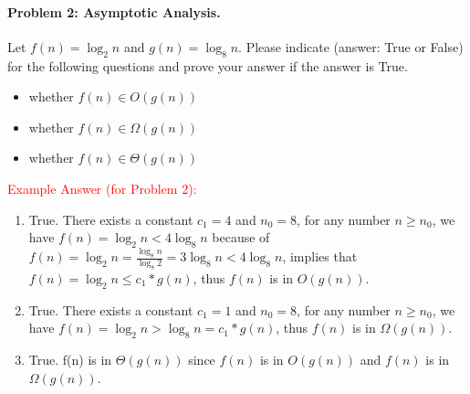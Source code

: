 
\paragraph{Problem 2: Asymptotic Analysis.}  	
 Let $f(n)=\log_2 n$ and $g(n)=\log_8 n$. Please indicate (answer: True or False) for the following questions and prove your answer if the answer is True.  
\begin{itemize}
	\item  whether $ f(n)\in O(g(n))$
	\item  whether $ f(n)\in \Omega(g(n))$
	\item  whether $ f(n) \in \Theta(g(n))$
\end{itemize}  
 

\textcolor{red}{Example Answer (for Problem 2):} 
	\begin{enumerate}[label=(\alph*)]
		   
			\item
		True. There exists a constant $c_1=4 $ and $n_0=8$, for any number $n \ge n_0$, we have $f(n) = \log_2 n < 4 \log_8 n $ because of $f(n) = \log_2 n = \frac{\log_8 n}{\log_8 2} = 3 \log_8 n < 4 \log_8 n $, implies that $f(n) = \log_2 n  \le c_1 *g(n)$, thus $f(n)$ is in $O(g(n))$.
		
		\item	True. There exists a constant $c_1=1$ and $n_0=8$, for any number $n \ge n_0$, we have $f(n)= \log_2 n >  \log_8 n = c_1 *g(n)$, thus $f(n)$ is in $\Omega(g(n))$.
		
		\item	True.  f(n) is in $\Theta(g(n))$ since $f(n)$ is in $O(g(n))$ and $f(n)$ is in $\Omega(g(n))$.
	\end{enumerate}